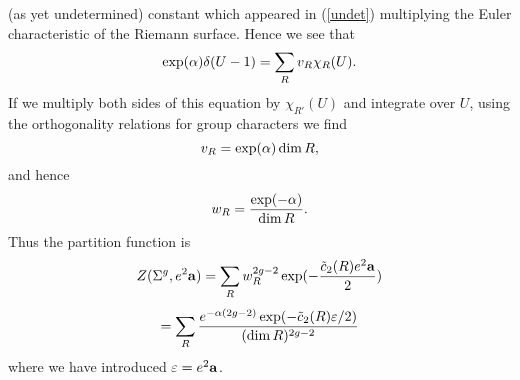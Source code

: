 \documentclass[12pt]{article}
\begin{document}
(as yet undetermined) constant which 
appeared in (\ref{undet}) multiplying the 
Euler characteristic of the Riemann surface.
Hence we see that 
\begin{equation}
\exp(\alpha) \delta (U-1) = \sum_R v_R \chi_R (U). 
\end{equation}
If we multiply both sides of this equation by 
$\chi_{R'} (U)$ and integrate over $U$, using the orthogonality
relations for group characters we find
\begin{equation}
v_R = \exp (\alpha) \dim R, 
\end{equation}
and hence
\begin{equation}
w_R = \frac{\exp ( - \alpha)}{\dim R}. 
\end{equation}
Thus the partition function is
\begin{equation}
Z(\Sigma^g, e^2 {\bf a}) = 
\sum_{R} w_R^{2g-2} \exp ( - \frac{\tilde{c}_2 (R) e^2 {\bf a}}{2} ) 
\end{equation}
\begin{equation} 
= \sum_R \frac{ e^{-\alpha(2g-2)}
 \exp ( - \tilde{c}_2 (R) \varepsilon/2  ) }{
(\dim R)^{2g-2} }
\end{equation}
where we have introduced $\varepsilon = e^2 {\bf a}$. 

\begin{figure}
\centerline{}
\end{figure}
\end{document}
